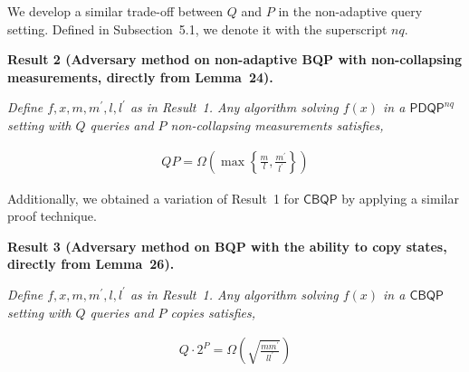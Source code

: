\documentclass[10pt,a4paper]{article}
\begin{document}



We develop a similar trade-off between $Q$ and $P$ in the non-adaptive query setting. Defined in Subsection 5.1, we denote it with the superscript $nq$.\par





\par\medskip\noindent\textbf{
\textbf{Result 2}\textbf{ }(\textbf{Adversary method on non-adaptive BQP with non-collapsing measurements}, directly from Lemma 24)\textbf{.}
}\par



\emph{Define $f,x,m,m^{\prime},l,l^{\prime}$ as in Result 1. Any algorithm solving $f(x)$ in a $\mathsf{PDQP}^{nq}$ setting with $Q$ queries and $P$ non-collapsing measurements satisfies,}\par


\[\begin{gathered}
\displaystyle QP=\Omega\left(\max\left\{\frac{m}{l},\frac{m^{\prime}}{l^{\prime}}\right\}\right)
\end{gathered}\]






Additionally, we obtained a variation of Result 1 for $\mathsf{CBQP}$ by applying a similar proof technique.\par





\par\medskip\noindent\textbf{
\textbf{Result 3}\textbf{ }(\textbf{Adversary method on BQP with the ability to copy states}, directly from Lemma 26)\textbf{.}
}\par



\emph{Define $f,x,m,m^{\prime},l,l^{\prime}$ as in Result 1. Any algorithm solving $f(x)$ in a $\mathsf{CBQP}$ setting with $Q$ queries and $P$ copies satisfies,}\par


\[\begin{gathered}
\displaystyle Q\cdot 2^{P}=\Omega\left(\sqrt{\frac{mm^{\prime}}{ll^{\prime}}}\right)
\end{gathered}\]
\end{document}
